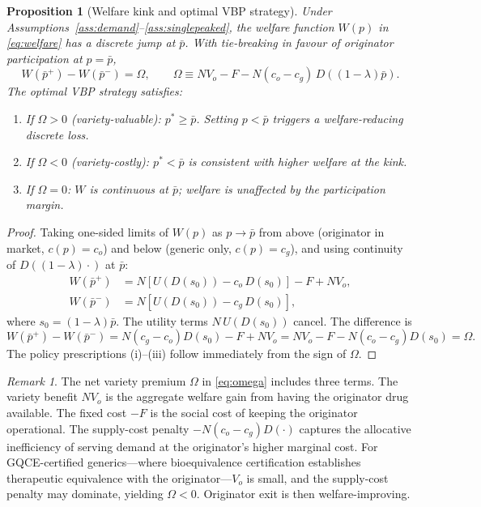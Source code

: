 \documentclass[12pt]{article}
\theoremstyle{plain}
\newtheorem{proposition}{Proposition}
\theoremstyle{definition}
\theoremstyle{remark}
\newtheorem{remark}{Remark}
\newcommand{\pbar}{\bar{p}}
\newcommand{\1}{\mathbf{1}}
\begin{document}
\begin{proposition}[Welfare kink and optimal VBP strategy]
\label{prop:kink}
Under Assumptions~\ref{ass:demand}--\ref{ass:singlepeaked}, the welfare function $W(p)$ in \eqref{eq:welfare} has a discrete jump at $\pbar$. With tie-breaking in favour of originator participation at $p = \pbar$,
\begin{equation}
W(\pbar^+) - W(\pbar^-) = \Omega, \qquad \Omega \equiv N V_o - F - N(c_o - c_g)\,D\!\left((1-\lambda)\pbar\right).
\label{eq:omega}
\end{equation}
The optimal VBP strategy satisfies:
\begin{enumerate}
\item[(i)] If $\Omega > 0$ (variety-valuable): $p^* \geq \pbar$. Setting $p < \pbar$ triggers a welfare-reducing discrete loss.
\item[(ii)] If $\Omega < 0$ (variety-costly): $p^* < \pbar$ is consistent with higher welfare at the kink.
\item[(iii)] If $\Omega = 0$: $W$ is continuous at $\pbar$; welfare is unaffected by the participation margin.
\end{enumerate}
\end{proposition}

\begin{proof}
Taking one-sided limits of $W(p)$ as $p \to \pbar$ from above (originator in market, $c(p) = c_o$) and below (generic only, $c(p) = c_g$), and using continuity of $D((1-\lambda)\cdot)$ at $\pbar$:
\begin{align*}
W(\pbar^+) &= N\!\left[U(D(s_0)) - c_o\,D(s_0)\right] - F + NV_o, \\
W(\pbar^-) &= N\!\left[U(D(s_0)) - c_g\,D(s_0)\right],
\end{align*}
where $s_0 = (1-\lambda)\pbar$. The utility terms $N\,U(D(s_0))$ cancel. The difference is
$$W(\pbar^+) - W(\pbar^-) = N(c_g - c_o)D(s_0) - F + NV_o = NV_o - F - N(c_o-c_g)D(s_0) = \Omega.$$
The policy prescriptions (i)--(iii) follow immediately from the sign of $\Omega$.
\end{proof}

\begin{remark}
The net variety premium $\Omega$ in \eqref{eq:omega} includes three terms. The variety benefit $NV_o$ is the aggregate welfare gain from having the originator drug available. The fixed cost $-F$ is the social cost of keeping the originator operational. The supply-cost penalty $-N(c_o-c_g)D(\cdot)$ captures the allocative inefficiency of serving demand at the originator's higher marginal cost. For GQCE-certified generics---where bioequivalence certification establishes therapeutic equivalence with the originator---$V_o$ is small, and the supply-cost penalty may dominate, yielding $\Omega < 0$. Originator exit is then welfare-improving.
\end{remark}
\end{document}
